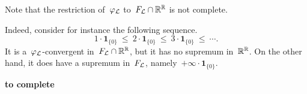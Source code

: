 \documentclass[main.tex]{subfiles}
\begin{document}
%
%
\begin{rem}
\label{R:non-finite-functions}
Note that the restriction of~$\varphi_{\mathcal{L}}$ to~$F_{\mathcal{L}}\cap \mathbb{R}^{\mathbb{R}}$
is not complete.

Indeed,
consider for instance
the following sequence.
\begin{equation*}
1\cdot\mathbf{1}_{\{0\}} 
\ \leq\   2\cdot\mathbf{1}_{\{0\}} 
\ \leq\   3\cdot\mathbf{1}_{\{0\}}
\ \leq\  \dotsb.
\end{equation*}
It is a~$\varphi_{\mathcal{L}}$-convergent
in~$F_{\mathcal{L}}\cap \mathbb{R}^{\mathbb{R}}$,
but it has no supremum in~$\mathbb{R}^{\mathbb{R}}$.
On the other hand,
it does have a supremum in~$F_{\mathcal{L}}$, 
namely~$+\infty\cdot \mathbf{1}_{\{0\}}$.

\textbf{to complete}

\end{rem}
%
%
\end{document}

